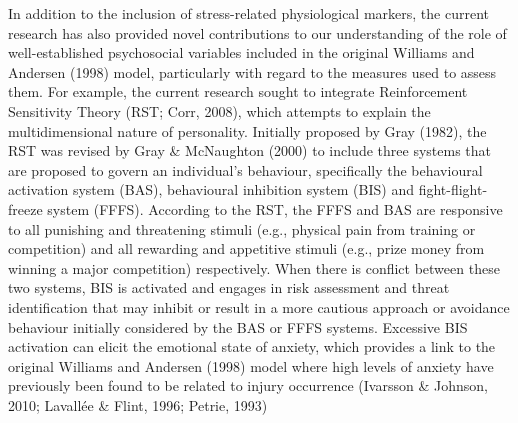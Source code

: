 \documentclass[
  english,
  man,floatsintext]{apa6}
\begin{document}
In addition to the inclusion of stress-related physiological markers, the current research has also provided novel contributions to our understanding of the role of well-established psychosocial variables included in the original Williams and Andersen (1998) model, particularly with regard to the measures used to assess them.
For example, the current research sought to integrate Reinforcement Sensitivity Theory (RST; Corr, 2008), which attempts to explain the multidimensional nature of personality.
Initially proposed by Gray (1982), the RST was revised by Gray \& McNaughton (2000) to include three systems that are proposed to govern an individual's behaviour, specifically the behavioural activation system (BAS), behavioural inhibition system (BIS) and fight-flight-freeze system (FFFS).
According to the RST, the FFFS and BAS are responsive to all punishing and threatening stimuli (e.g., physical pain from training or competition) and all rewarding and appetitive stimuli (e.g., prize money from winning a major competition) respectively.
When there is conflict between these two systems, BIS is activated and engages in risk assessment and threat identification that may inhibit or result in a more cautious approach or avoidance behaviour initially considered by the BAS or FFFS systems.
Excessive BIS activation can elicit the emotional state of anxiety, which provides a link to the original Williams and Andersen (1998) model where high levels of anxiety have previously been found to be related to injury occurrence (Ivarsson \& Johnson, 2010; Lavallée \& Flint, 1996; Petrie, 1993)
\end{document}
